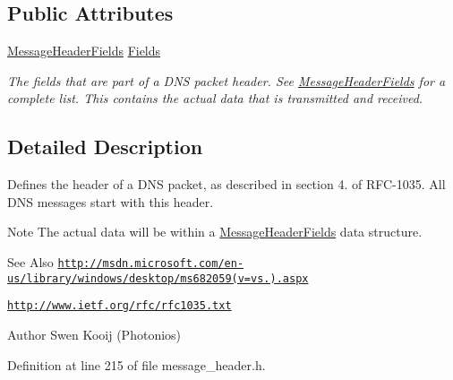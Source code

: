 \subsection*{Public Attributes}
\begin{DoxyCompactItemize}
\item 
\hyperlink{struct_senergy_1_1_dns_1_1_message_header_fields}{Message\-Header\-Fields} \hyperlink{class_senergy_1_1_dns_1_1_message_header_a014c173ce2b2c5bb06ae9e5d0e201159}{Fields}
\begin{DoxyCompactList}\small\item\em The fields that are part of a D\-N\-S packet header. See \hyperlink{struct_senergy_1_1_dns_1_1_message_header_fields}{Message\-Header\-Fields} for a complete list. This contains the actual data that is transmitted and received. \end{DoxyCompactList}\end{DoxyCompactItemize}


\subsection{Detailed Description}
Defines the header of a D\-N\-S packet, as described in section 4. of R\-F\-C-\/1035. All D\-N\-S messages start with this header. 

\begin{DoxyNote}{Note}
The actual data will be within a \hyperlink{struct_senergy_1_1_dns_1_1_message_header_fields}{Message\-Header\-Fields} data structure.
\end{DoxyNote}
\begin{DoxySeeAlso}{See Also}
\href{http://msdn.microsoft.com/en-us/library/windows/desktop/ms682059(v=vs.85).aspx}{\tt http\-://msdn.\-microsoft.\-com/en-\/us/library/windows/desktop/ms682059(v=vs.).\-aspx} 

\href{http://www.ietf.org/rfc/rfc1035.txt}{\tt http\-://www.\-ietf.\-org/rfc/rfc1035.\-txt}
\end{DoxySeeAlso}
\begin{DoxyAuthor}{Author}
Swen Kooij (Photonios) 
\end{DoxyAuthor}


Definition at line 215 of file message\-\_\-header.\-h.



